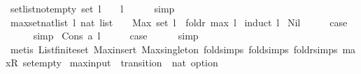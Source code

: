 \begin{isabellebody}
\isanewline
%
\endisadelimproof
\isanewline
{}\isamarkupfalse%
\ set{\isacharunderscore}list{\isacharunderscore}not{\isacharunderscore}empty{\isacharcolon}\ {\isachardoublequoteopen}{\isacharparenleft}set\ l\ {\isasymnoteq}\ {\isacharbraceleft}{\isacharbraceright}{\isacharparenright}\ {\isacharequal}\ {\isacharparenleft}l\ {\isasymnoteq}\ {\isacharbrackleft}{\isacharbrackright}{\isacharparenright}{\isachardoublequoteclose}\isanewline
%
\isadelimproof
\ \ %
\endisadelimproof
%
\isatagproof
{}\isamarkupfalse%
\ simp%
\endisatagproof
{\isafoldproof}%
%
\isadelimproof
\isanewline
%
\endisadelimproof
\isanewline
{}\isamarkupfalse%
\ max{\isacharunderscore}set{\isacharunderscore}nat{\isacharunderscore}list{\isacharcolon}\ {\isachardoublequoteopen}{\isacharparenleft}l{\isacharcolon}{\isacharcolon}\ nat\ list{\isacharparenright}\ {\isasymnoteq}\ {\isacharbrackleft}{\isacharbrackright}\ {\isasymLongrightarrow}\ Max\ {\isacharparenleft}set\ l{\isacharparenright}\ {\isacharequal}\ foldr\ max\ l\ {}{\isachardoublequoteclose}\isanewline
%
\isadelimproof
%
\endisadelimproof
%
\isatagproof
{}\isamarkupfalse%
{\isacharparenleft}induct\ l{\isacharparenright}\isanewline
{}\isamarkupfalse%
\ Nil\isanewline
\ \ \isamarkupfalse%
\ \isamarkupfalse%
\ {\isacharquery}case\isanewline
\ \ \ \ \isamarkupfalse%
\ simp\isanewline
{}\isamarkupfalse%
\isanewline
{}\isamarkupfalse%
\ {\isacharparenleft}Cons\ a\ l{\isacharparenright}\isanewline
\ \ \isamarkupfalse%
\ \isamarkupfalse%
\ {\isacharquery}case\isanewline
\ \ \ \ \isamarkupfalse%
\ simp\isanewline
\ \ \ \ \isamarkupfalse%
\ {\isacharparenleft}metis\ List{\isachardot}finite{\isacharunderscore}set\ Max{\isacharunderscore}insert\ Max{\isacharunderscore}singleton\ fold{\isachardot}simps{\isacharparenleft}{}{\isacharparenright}\ fold{\isacharunderscore}simps{\isacharparenleft}{}{\isacharparenright}\ foldr{\isachardot}simps{\isacharparenleft}{}{\isacharparenright}\ max{\isacharunderscore}{}R\ set{\isacharunderscore}empty{\isacharparenright}\isanewline
{}\isamarkupfalse%
%
\endisatagproof
{\isafoldproof}%
%
\isadelimproof
\isanewline
%
\endisadelimproof
\isanewline
{}\isamarkupfalse%
\ max{\isacharunderscore}input\ {\isacharcolon}{\isacharcolon}\ {\isachardoublequoteopen}transition\ {\isasymRightarrow}\ nat\ option{\isachardoublequoteclose}\ \isanewline

\end{isabellebody}
